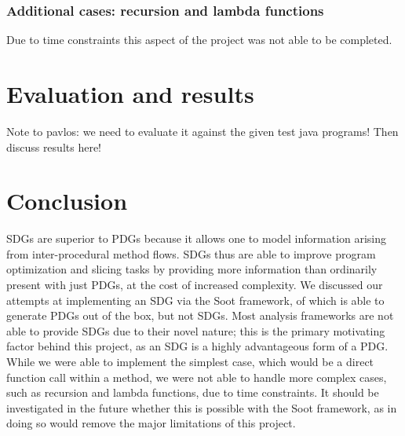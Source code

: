 \documentclass[authoryear,preprint]{sigplanconf}
\begin{document}
\subsubsection{Additional cases: recursion and lambda functions}

Due to time constraints this aspect of the project was not able to be completed.

\section{Evaluation and results}

Note to pavlos: we need to evaluate it against the given test java programs! Then discuss results here!

\section{Conclusion}

SDGs are superior to PDGs because it allows one to model information arising from inter-procedural method flows. SDGs thus are able to improve program optimization and slicing tasks by providing more information than ordinarily present with just PDGs, at the cost of increased complexity. We discussed our attempts at implementing an SDG via the Soot framework, of which is able to generate PDGs out of the box, but not SDGs. Most analysis frameworks are not able to provide SDGs due to their novel nature; this is the primary motivating factor behind this project, as an SDG is a highly advantageous form of a PDG. While we were able to implement the simplest case, which would be a direct function call within a method, we were not able to handle more complex cases, such as recursion and lambda functions, due to time constraints. It should be investigated in the future whether this is possible with the Soot framework, as in doing so would remove the major limitations of this project.






\end{document}
